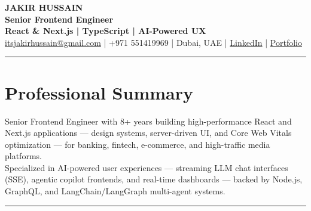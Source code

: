 \documentclass[10pt,a4paper]{article}
\newcommand{\NameSize}{\fontsize{22}{24}\selectfont}
\newcommand{\TitleSize}{\fontsize{10.8}{13}\selectfont}
\newcommand{\TagSize}{\fontsize{10}{12}\selectfont}
\newcommand{\BodySize}{\fontsize{9.7}{12}\selectfont}
\newcommand{\SmallBody}{\fontsize{9.2}{11.4}\selectfont}
\newcommand{\topdivider}{\color{rulecolor}\rule{\linewidth}{0.5pt}\color{primary}\vspace{0pt}}
\newcommand{\ATSspaceoff}{\ifdefined\pdfinterwordspaceoff\pdfinterwordspaceoff\fi}
\newcommand{\ATSspaceon}{\ifdefined\pdfinterwordspaceon\pdfinterwordspaceon\fi}
\begin{document}
\BodySize

\begin{center}

{\ATSspaceoff\NameSize \bfseries JAKIR HUSSAIN\ATSspaceon}\\[4pt]
{\TitleSize \bfseries Senior Frontend Engineer}\\[2pt]
{\TagSize \bfseries React \& Next.js \;|\; TypeScript \;|\; AI-Powered UX}\\[6pt]

\href{mailto:itsjakirhussain@gmail.com}{itsjakirhussain@gmail.com} \;|\;
+971 551419969 \;|\;
Dubai, UAE \;|\;
\href{https://linkedin.com/in/iam-hussain}{LinkedIn} \;|\;
\href{https://iam-hussain.site}{Portfolio}

\end{center}
\vspace{-8pt}
\topdivider
\vspace{2pt}
\section*{Professional Summary}
\SmallBody
Senior Frontend Engineer with 8+ years building high-performance React and Next.js applications — design systems, server-driven UI, and Core Web Vitals optimization — for banking, fintech, e-commerce, and high-traffic media platforms.\\[5pt]

Specialized in AI-powered user experiences — streaming LLM chat interfaces (SSE), agentic copilot frontends, and real-time dashboards — backed by Node.js, GraphQL, and LangChain/LangGraph multi-agent systems.\\[8pt]

\vspace{-8pt}
\topdivider
\vspace{2pt}
\end{document}
